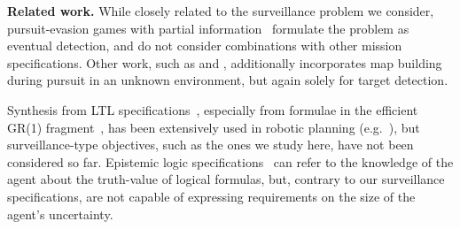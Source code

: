 {\bf Related work.}
While closely related to the surveillance problem we consider, pursuit-evasion games with partial information~\cite{Chung2011, Chin2010, Antoniades2003} formulate the problem as eventual detection, and do not consider combinations with other mission specifications. Other work, such as \cite{Vidal2002} and \cite{Kim2001}, additionally incorporates map building during pursuit in an unknown environment, but again solely for target detection.

Synthesis from LTL specifications~\cite{Pnueli1989}, especially from formulae in the efficient GR(1) fragment~\cite{Piterman2006}, has been extensively used in robotic planning (e.g.~\cite{wong2012,Kress2007}), but surveillance-type objectives, such as the ones we study here, have not been considered so far. Epistemic logic specifications~\cite{MeydenV98} can refer to the knowledge of the agent about the truth-value of logical formulas, but, contrary to our surveillance specifications, are not capable of expressing requirements on the size of the agent's uncertainty.




